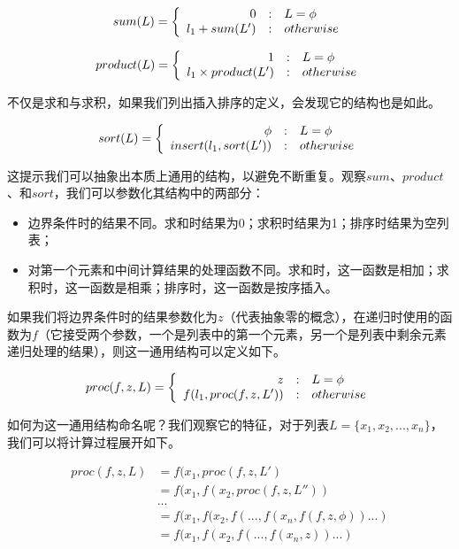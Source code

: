 \documentclass[b5paper]{ctexart}
\begin{document}
\[
sum(L) =  \left \{
  \begin{array}
  {r@{\quad:\quad}l}
  0 & L = \phi \\
  l_1 + sum(L') & otherwise
  \end{array}
\right.
\]

\[
product(L) = \left \{
  \begin{array}
  {r@{\quad:\quad}l}
  1 & L = \phi \\
  l_1 \times product(L') & otherwise
  \end{array}
\right.
\]

不仅是求和与求积，如果我们列出插入排序的定义，会发现它的结构也是如此。

\[
sort(L) = \left \{
  \begin{array}
  {r@{\quad:\quad}l}
  \phi & L = \phi \\
  insert(l_1, sort(L')) & otherwise
  \end{array}
\right.
\]

这提示我们可以抽象出本质上通用的结构，以避免不断重复。观察$sum$、$product$、和$sort$，我们可以参数化其结构中的两部分：

\begin{itemize}
\item 边界条件时的结果不同。求和时结果为0；求积时结果为1；排序时结果为空列表；
\item 对第一个元素和中间计算结果的处理函数不同。求和时，这一函数是相加；求积时，这一函数是相乘；排序时，这一函数是按序插入。
\end{itemize}

如果我们将边界条件时的结果参数化为$z$（代表抽象零的概念），在递归时使用的函数为$f$（它接受两个参数，一个是列表中的第一个元素，另一个是列表中剩余元素递归处理的结果），则这一通用结构可以定义如下。

\[
proc(f, z, L) = \left \{
  \begin{array}
  {r@{\quad:\quad}l}
  z & L = \phi \\
  f(l_1, proc(f, z, L')) & otherwise
  \end{array}
\right.
\]

如何为这一通用结构命名呢？我们观察它的特征，对于列表$L = \{x_1, x_2, ..., x_n \}$，我们可以将计算过程展开如下。

\[
\begin{array}{rl}
proc(f, z, L) & = f(x_1, proc(f, z, L') \\
        & = f(x_1, f(x_2, proc(f, z, L'')) \\
        & ... \\
        & = f(x_1, f(x_2, f(..., f(x_n, f(f, z, \phi))...) \\
        & = f(x_1, f(x_2, f(..., f(x_n, z))...)
\end{array}
\]
\end{document}
